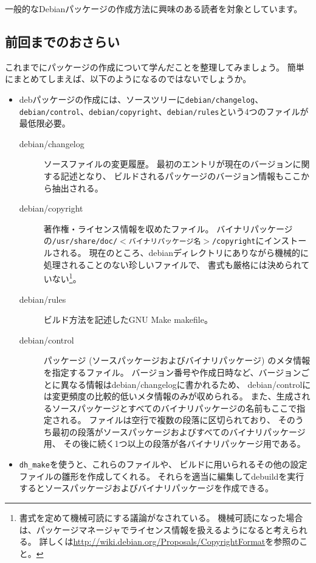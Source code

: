 \documentclass[mingoth,a4paper]{jsarticle}
\begin{document}
一般的なDebianパッケージの作成方法に興味のある読者を対象としています。

\subsection{前回までのおさらい}

これまでにパッケージの作成について学んだことを整理してみましょう。
簡単にまとめてしまえば、以下のようになるのではないでしょうか。

\begin{itemize}
 \item debパッケージの作成には、ソースツリーに\texttt{debian/changelog}、\texttt{debian/control}、\texttt{debian/copyright}、\texttt{debian/rules}という4つのファイルが最低限必要。
\begin{description}
 \item[debian/changelog] ソースファイルの変更履歴。
    最初のエントリが現在のバージョンに関する記述となり、
    ビルドされるパッケージのバージョン情報もここから抽出される。
 \item[debian/copyright] 著作権・ライセンス情報を収めたファイル。
    バイナリパッケージの\texttt{/usr/share/doc/$<$バイナリパッケージ名$>$/copyright}にインストールされる。
    現在のところ、debianディレクトリにありながら機械的に処理されることのない珍しいファイルで、
    書式も厳格には決められていない\footnote{書式を定めて機械可読にする議論がなされている。
    機械可読になった場合は、パッケージマネージャでライセンス情報を扱えるようになると考えられる。
    詳しくは\url{http://wiki.debian.org/Proposals/CopyrightFormat}を参照のこと。}。
 \item[debian/rules] ビルド方法を記述したGNU Make makefile。
 \item[debian/control] パッケージ (ソースパッケージおよびバイナリパッケージ) のメタ情報を指定するファイル。
    バージョン番号や作成日時など、バージョンごとに異なる情報はdebian/changelogに書かれるため、
    debian/controlには変更頻度の比較的低いメタ情報のみが収められる。
    また、生成されるソースパッケージとすべてのバイナリパッケージの名前もここで指定される。
    ファイルは空行で複数の段落に区切られており、
    そのうち最初の段落がソースパッケージおよびすべてのバイナリパッケージ用、
    その後に続く1つ以上の段落が各バイナリパッケージ用である。
\end{description} 
 \item \texttt{dh\_make}を使うと、これらのファイルや、
  ビルドに用いられるその他の設定ファイルの雛形を作成してくれる。
  それらを適当に編集してdebuildを実行するとソースパッケージおよびバイナリパッケージを作成できる。
\end{itemize}
\end{document}
